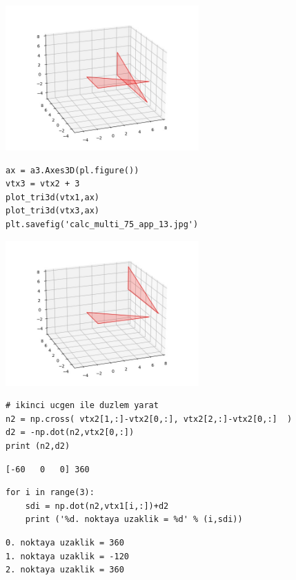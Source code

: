 \documentclass[12pt,fleqn]{article}\usepackage{../../common}
\begin{document}
\includegraphics[width=20em]{calc_multi_75_app_12.jpg}

\begin{verbatim}
ax = a3.Axes3D(pl.figure())
vtx3 = vtx2 + 3
plot_tri3d(vtx1,ax)
plot_tri3d(vtx3,ax)
plt.savefig('calc_multi_75_app_13.jpg')
\end{verbatim}

\includegraphics[width=20em]{calc_multi_75_app_13.jpg}

\begin{verbatim}
# ikinci ucgen ile duzlem yarat
n2 = np.cross( vtx2[1,:]-vtx2[0,:], vtx2[2,:]-vtx2[0,:]  )
d2 = -np.dot(n2,vtx2[0,:])
print (n2,d2)
\end{verbatim}

\begin{verbatim}
[-60   0   0] 360
\end{verbatim}

\begin{verbatim}
for i in range(3):
    sdi = np.dot(n2,vtx1[i,:])+d2
    print ('%d. noktaya uzaklik = %d' % (i,sdi))
\end{verbatim}

\begin{verbatim}
0. noktaya uzaklik = 360
1. noktaya uzaklik = -120
2. noktaya uzaklik = 360
\end{verbatim}
\end{document}

